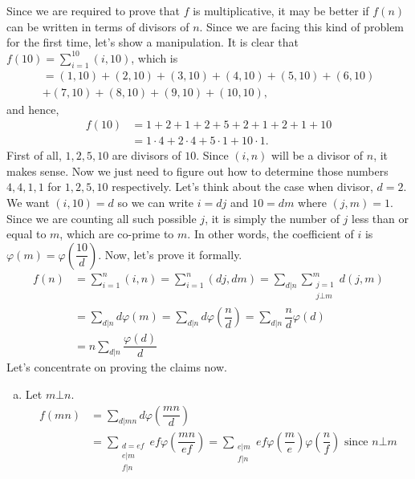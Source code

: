 \documentclass[problems.tex]{subfile}
\begin{document}
	\begin{solution}
		Since we are required to prove that $f$ is multiplicative, it may be better if $f(n)$ can be written in terms of divisors of $n$. Since we are facing this kind of problem for the first time, let's show a manipulation. It is clear that $f(10) = \sum_{i=1}^{10}(i,10)$, which is
			\begin{multline*}
					  = (1,10)+(2,10)+(3,10)+(4,10)+(5,10)+(6,10)\\+(7,10)+(8,10)+(9,10)+(10,10),
			\end{multline*}
		and hence,
			\begin{align*}
				f(10) & = 1+2+1+2+5+2+1+2+1+10\\
				& = 1\cdot4+2\cdot4+5\cdot1+10\cdot1.
			\end{align*}
		First of all, $1,2,5,10$ are divisors of $10$. Since $(i,n)$ will be a divisor of $n$, it makes sense. Now we just need to figure out how to determine those numbers $4,4,1,1$ for $1,2,5,10$ respectively. Let's think about the case when divisor, $d=2$. We want $(i,10)=d$ so we can write $i=dj$ and $10=dm$ where $(j,m)=1$. Since we are counting all such possible $j$, it is simply the number of $j$ less than or equal to $m$, which are co-prime to $m$. In other words, the coefficient of $i$ is $\varphi(m)=\varphi\left(\dfrac{10}{d}\right)$. Now, let's prove it formally.
			\begin{align*}
				f(n) & = \sum_{i=1}^{n}(i,n) = \sum_{i=1}^{n}(dj,dm)= \sum_{d|n}\sum_{\substack{j=1\\j\bot m}}^{m}d(j,m)\\
					 & = \sum_{d|n}d\varphi(m) = \sum_{d|n}d\varphi\left(\dfrac{n}{d}\right)  = \sum_{d|n}\dfrac{n}{d}\varphi(d)\\
					 & = n\sum_{d|n}\dfrac{\varphi(d)}{d}
			\end{align*}
		Let's concentrate on proving the claims now.
			\begin{enumerate}[(a)]
				\item Let $m\bot n$.
						\begin{align*}
							f(mn) & = \sum_{d|mn}d\varphi\left(\dfrac{mn}{d}\right)\\
								  & = \sum_{\substack{d=ef\\e|m\\f|n}}ef\varphi\left(\dfrac{mn}{ef}\right)  = \sum_{\substack{e|m\\f|n}}ef\varphi\left(\dfrac{m}{e}\right)\varphi\left(\dfrac{n}{f}\right)\mbox{ since }n\bot m\\

\end{align*}
\end{enumerate}
\end{solution}
\end{document}
